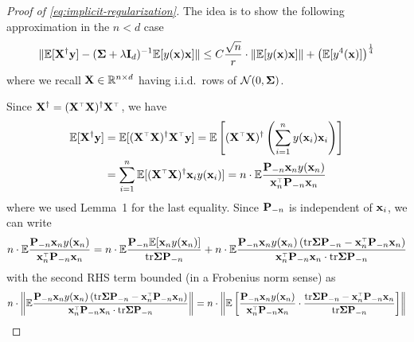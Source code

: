 \documentclass[11pt]{article}
\begin{document}
\begin{proof}[Proof of \eqref{eq:implicit-regularization}]
The idea is to show the following approximation in the $n < d$ case
\[
  \| \E[\X^\dagger \y] - (\Sigmab + \lambda \I_d)^{-1} \E[y(\x) \x] \| \le C \frac{\sqrt n}{r} \cdot \| \E[y(\x) \x] \| + \left( \E[y^4(\x)] \right)^{\frac14}
\]
where we recall $\X \in \mathbb R^{n \times d}$ having i.i.d.~rows of $\mathcal N(0, \Sigmab)$.

Since $\X^\dagger = (\X^\top \X)^\dagger \X^\top$, we have
\begin{align*}
  \E[ \X^\dagger \y] & = \E[ (\X^\top \X)^\dagger \X^\top \y] =  \E \left[ (\X^\top \X)^\dagger \left( \sum_{i=1}^n y(\x_i) \x_i \right) \right] \\
  & = \sum_{i=1}^n \E [(\X^\top \X)^\dagger \x_i y(\x_i)] = n \cdot \E \frac{\P_{-n} \x_n y(\x_n)}{ \x_n^\top \P_{-n} \x_n }
\end{align*}
where we used Lemma~1 for the last equality. Since $\P_{-n}$ is independent of $\x_i$, we can write
\[
  n \cdot \E \frac{\P_{-n} \x_n y(\x_n)}{ \x_n^\top \P_{-n} \x_n } = n \cdot \E \frac{\P_{-n} \E [\x_n y(\x_n)] }{ \tr \Sigmab \P_{-n} } + n \cdot \E \frac{\P_{-n} \x_n y(\x_n) \left( \tr \Sigmab \P_{-n} - \x_n^\top \P_{-n} \x_n \right) }{ \x_n^\top \P_{-n} \x_n \cdot \tr \Sigmab \P_{-n} }
\]
with the second RHS term bounded (in a Frobenius norm sense) as
\begin{align}
   & n \cdot \left\|\E \frac{\P_{-n} \x_n y(\x_n) \left( \tr \Sigmab \P_{-n} - \x_n^\top \P_{-n} \x_n \right) }{ \x_n^\top \P_{-n} \x_n \cdot \tr \Sigmab \P_{-n} } \right\| = n \cdot \left\| \E \left[ \frac{ \P_{-n} \x_n y(\x_n) }{\x_n^\top \P_{-n} \x_n } \cdot \frac{ \tr \Sigmab \P_{-n} - \x_n^\top \P_{-n} \x_n }{ \tr \Sigmab \P_{-n} } \right] \right\| \nonumber \\

\end{align}
\end{proof}
\end{document}
